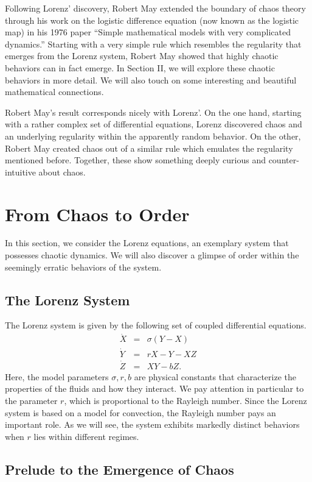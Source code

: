 \documentclass[twocolumn,amsmath,amssymb,aps]{revtex4}
\begin{document}
Following Lorenz' discovery, Robert May extended the boundary of chaos theory through his work on the logistic difference equation (now known as the logistic map) in his 1976 paper ``Simple mathematical models with very complicated dynamics.'' \cite{rmay76} Starting with a very simple rule which resembles the regularity that emerges from the Lorenz system, Robert May showed that highly chaotic behaviors can in fact emerge. In Section II, we will explore these chaotic behaviors in more detail. We will also touch on some interesting and beautiful mathematical connections.

Robert May's result corresponds nicely with Lorenz'. On the one hand, starting with a rather complex set of differential equations, Lorenz discovered chaos and an underlying regularity within the apparently random behavior. On the other, Robert May created chaos out of a similar rule which emulates the regularity mentioned before. Together, these show something deeply curious and counter-intuitive about chaos.




\section{From Chaos to Order}
In this section, we consider the Lorenz equations, an exemplary system that possesses chaotic dynamics. We will also discover a glimpse of order within the seemingly erratic behaviors of the system.  
\subsection{The Lorenz System}
The Lorenz system is given by the following set of coupled differential equations.\cite{flow}
\begin{eqnarray}
\dot{X} &=& \sigma(Y-X)\nonumber\\
\dot{Y} &=& r X - Y - XZ\nonumber\\
\dot{Z} &=& XY - bZ\nonumber.
\end{eqnarray}
Here, the model parameters $\sigma, r, b$ are physical constants that characterize the properties of the fluids and how they interact. We pay attention in particular to the parameter $r$, which is proportional to the Rayleigh number. Since the Lorenz system is based on a model for convection, the Rayleigh number pays an important role. As we will see, the system exhibits markedly distinct behaviors when $r$ lies within different regimes.

\subsection{Prelude to the Emergence of Chaos}
\end{document}

